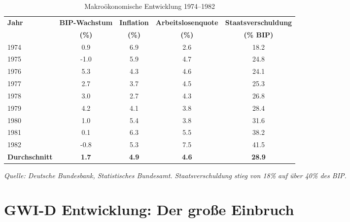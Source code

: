\begin{table}[ht]
    \centering
    \caption{Makroökonomische Entwicklung 1974–1982}
    \label{tab:makro_stagflation}
    \begin{tabular}{lcccc}
        \toprule
        \textbf{Jahr} & \textbf{BIP-Wachstum} & \textbf{Inflation} & \textbf{Arbeitslosenquote} & \textbf{Staatsverschuldung} \\
        & \textbf{(\%)} & \textbf{(\%)} & \textbf{(\%)} & \textbf{(\% BIP)} \\
        \midrule
        1974 & 0.9 & 6.9 & 2.6 & 18.2 \\
        1975 & -1.0 & 5.9 & 4.7 & 24.8 \\
        1976 & 5.3 & 4.3 & 4.6 & 24.1 \\
        1977 & 2.7 & 3.7 & 4.5 & 25.3 \\
        1978 & 3.0 & 2.7 & 4.3 & 26.8 \\
        1979 & 4.2 & 4.1 & 3.8 & 28.4 \\
        1980 & 1.0 & 5.4 & 3.8 & 31.6 \\
        1981 & 0.1 & 6.3 & 5.5 & 38.2 \\
        1982 & -0.8 & 5.3 & 7.5 & 41.5 \\
        \midrule
        \textbf{Durchschnitt} & \textbf{1.7} & \textbf{4.9} & \textbf{4.6} & \textbf{28.9} \\
        \bottomrule
    \end{tabular}
\end{table}

\begin{flushleft}
\footnotesize{\textit{Quelle: Deutsche Bundesbank, Statistisches Bundesamt. Staatsverschuldung stieg von 18\% auf über 40\% des BIP.}}
\end{flushleft}

\section{GWI-D Entwicklung: Der große Einbruch}

